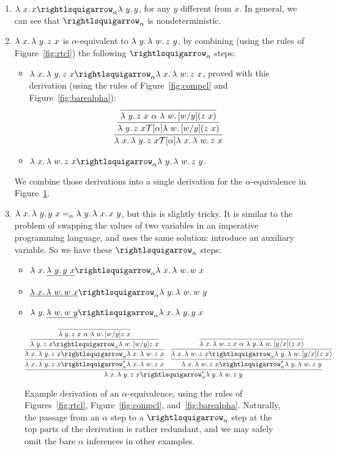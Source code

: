 \begin{enumerate}
\item $\lam{x}{x} \curva_\alpha \lam{y}{y}$, for any $y$ different from $x$.  In general, we can see that $\curva_\alpha$ is nondeterministic.
\item $\lambda\ x.\, \lambda\ y.\, z\ x$ is $\alpha$-equivalent to $\lambda\ y.\, \lambda\ w.\, z\ y$, by combining (using the rules of Figure~\ref{fig:rtcl})
  the following $\curva_\alpha$ steps:
  \begin{itemize}
  \item $\lam{x}{\lam{y}{z\ x}} \curva_\alpha \lam{x}{\lam{w}{z\ x}}$, proved with this derivation (using the rules of Figure~\ref{fig:compcl} and Figure~\ref{fig:barealpha}):
    \[
    \infer{\lam{x}{\lam{y}{z\ x}} \Tau[\alpha] \lam{x}{\lam{w}{z\ x}}}
          {\infer{\lam{y}{z\ x} \Tau[\alpha] \lam{w}{[w/y](z\ x)}}{\infer{\lam{y}{z\ x} \ \alpha \ \lam{w}{[w/y](z\ x)} }{\ }}}
          \]
    
    \item $\lam{x}{\lam{w}{z\ x}} \curva_\alpha \lam{y}{\lam{w}{z\ y}}$.
          
  \end{itemize}
  We combine those derivations into a single derivation for the $\alpha$-equivalence in Figure~\ref{fig:alphaexa}.
\item $\lambda\ x.\, \lambda\ y.\, y\ x =_\alpha \lambda\ y.\, \lambda\ x.\, x\ y$, but this is slightly tricky.  It is similar to the problem of swapping the values of two variables in an imperative programming language, and uses the same solution: introduce an auxiliary variable.  So we have these $\curva_\alpha$ steps:
  \begin{itemize}
  \item $\lam{x}{\underline{\lam{y}{y\ x}}} \curva_\alpha \lam{x}{\lam{w}{w\ x}}$
  \item $\underline{\lam{x}{\lam{w}{w\ x}}} \curva_\alpha \lam{y}{\lam{w}{w\ y}}$
  \item $\lam{y}{\underline{\lam{w}{w\ y}}} \curva_\alpha \lam{x}{\lam{y}{y\ x}}$
    \end{itemize}
\end{enumerate}

\begin{figure}
  \[
  \infer{\lam{x}{\lam{y}{z\ x}} \curva_\alpha^* \lam{y}{\lam{w}{z\ y}}}
    {\infer{\lam{x}{\lam{y}{z\ x}} \curva_\alpha^* \lam{x}{\lam{w}{z\ x}}}
        {\infer{\lam{x}{\lam{y}{z\ x}} \curva_\alpha \lam{x}{\lam{w}{z\ x}}}
          {\infer{\lam{y}{z\ x} \curva_\alpha \lam{w}{[w/y]z\ x}}{\infer{\lam{y}{z\ x} \ \alpha\  \lam{w}{[w/y]z\ x}}{\ } }}} & 
        \infer{\lam{x}{\lam{w}{z\ x}} \curva_\alpha^* \lam{y}{\lam{w}{z\ y}}}
              {\infer{\lam{x}{\lam{w}{z\ x}} \curva_\alpha \lam{y}{\lam{w}{[y/x](z\ x)}}}{\infer{\lam{x}{\lam{w}{z\ x}} \ \alpha\  \lam{y}{\lam{w}{[y/x](z\ x)}}}{\ } }}}
    \]
\caption{Example derivation of an $\alpha$-equivalence, using the rules of Figures~\ref{fig:rtcl}, Figure~\ref{fig:compcl}, and~\ref{fig:barealpha}. Naturally, the passage from an $\alpha$ step to a $\curva_\alpha$ step at the top parts of the derivation is rather redundant, and we may safely omit the bare $\alpha$ inferences in other examples.} 
\label{fig:alphaexa}
\end{figure}


